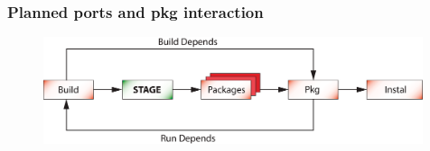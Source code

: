 \documentclass{beamer}
\begin{document}

\begin{frame}
\frametitle{Planned ports and pkg interaction}
\begin{figure}[h!]
  \centering
  \includegraphics[width=0.99\textwidth]{q2.eps}
\end{figure}
\end{frame}


\end{document}
